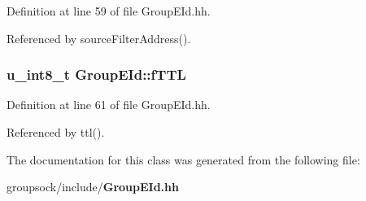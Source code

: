 Definition at line 59 of file Group\+E\+Id.\+hh.



Referenced by source\+Filter\+Address().

\subsubsection[{f\+T\+T\+L}]{\setlength{\rightskip}{0pt plus 5cm}u\+\_\+int8\+\_\+t Group\+E\+Id\+::f\+T\+T\+L\hspace{0.3cm}{\ttfamily [private]}}\label{classGroupEId_a15f2cb7ee831d2aa67efd6858b57521d}


Definition at line 61 of file Group\+E\+Id.\+hh.



Referenced by ttl().



The documentation for this class was generated from the following file\+:\begin{DoxyCompactItemize}
\item 
groupsock/include/{\bf Group\+E\+Id.\+hh}\end{DoxyCompactItemize}
